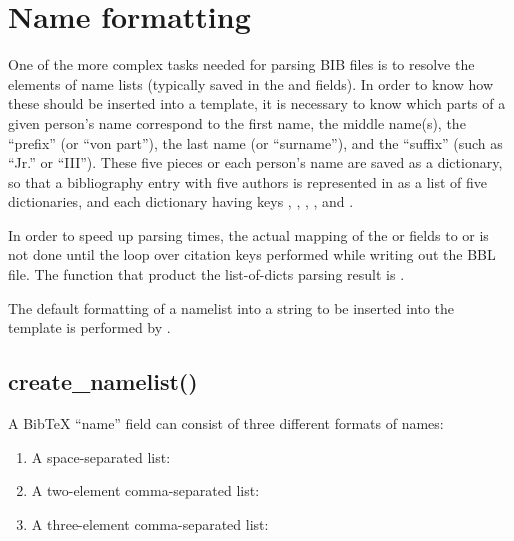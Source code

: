 \documentclass[letterpaper,10pt,english]{sphinxmanual}
\begin{document}
\section{Name formatting}
\label{\detokenize{developer_guide:name-formatting}}
One of the more complex tasks needed for parsing BIB files is to resolve the elements of name lists (typically saved in the  and  fields). In order to know how these should be inserted into a template, it is necessary to know which parts of a given person’s name correspond to the first name, the middle name(s), the “prefix” (or “von part”), the last name (or “surname”), and the “suffix” (such as “Jr.” or “III”). These five pieces or each person’s name are saved as a dictionary, so that a bibliography entry with five authors is represented in  as a list of five dictionaries, and each dictionary having keys , , , , and .

In order to speed up parsing times, the actual mapping of the  or  fields to  or  is not done until the loop over citation keys performed while writing out the BBL file. The function that product the list-of-dicts parsing result is .

The default formatting of a namelist into a string to be inserted into the template is performed by .


\subsection{create\_namelist()}
\label{\detokenize{developer_guide:create-namelist}}
A BibTeX “name” field can consist of three different formats of names:
\begin{enumerate}
\item {} 
A space-separated list: 

\item {} 
A two-element comma-separated list: 

\item {} 
A three-element comma-separated list: 

\end{enumerate}
\end{document}
